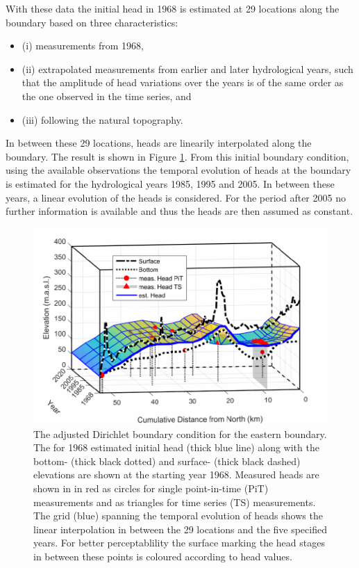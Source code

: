 With these data the initial head in 1968 is estimated at 29 locations along the boundary based on three characteristics:
    \begin{itemize}
        \item (i) measurements from 1968,
        \item (ii) extrapolated measurements from earlier and later hydrological years, such that the amplitude of head variations over the years is of the same order as the one observed in the time series, and
        \item (iii) following the natural topography.
    \end{itemize}

In between these 29 locations, heads are linearily interpolated along the boundary. 
The result is shown in Figure \ref{Fig-EastB}. 
From this initial boundary condition, using the available observations the temporal evolution of heads at the boundary is estimated for the hydrological years 1985, 1995 and 2005. 
In between these years, a linear evolution of the heads is considered. 
For the period after 2005 no further information is available and thus the heads are then assumed as constant.

\begin{figure}[h]
    \centering
    \includegraphics{./img/Fig-EasternBoundary.pdf}
    \caption{The adjusted Dirichlet boundary condition for the eastern boundary. The for 1968 estimated initial head (thick blue line) along with the bottom- (thick black dotted) and surface- (thick black dashed) elevations are shown at the starting year 1968. Measured heads are shown in in red as circles for single point-in-time (PiT) measurements and as triangles for time series (TS) measurements. The grid (blue) spanning the temporal evolution of heads shows the linear interpolation in between the 29 locations and the five specified years. For better perceptablility the surface marking the head stages in between these points is coloured according to head values.}
    \label{Fig-EastB}
\end{figure}

